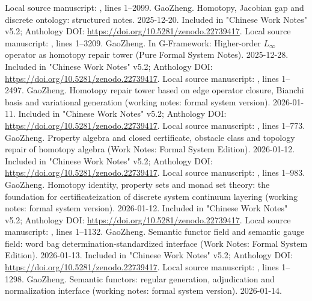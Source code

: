 \documentclass[11pt,a4paper]{article}
\theoremstyle{plain}
\theoremstyle{definition}
\theoremstyle{remark}
\begin{document}
\begin{CJK*}
\begin{thebibliography}
Local source manuscript: , lines 1--2099.  GaoZheng. Homotopy, Jacobian gap and discrete ontology: structured notes. 2025-12-20.\newblock
Included in "Chinese Work Notes" v5.2; Anthology DOI: \url{https://doi.org/10.5281/zenodo.22739417}.\newblock
Local source manuscript: , lines 1--3209.  GaoZheng. In G-Framework: Higher-order $L_\infty$ operator as homotopy repair tower (Pure Formal System Notes). 2025-12-28.\newblock
Included in "Chinese Work Notes" v5.2; Anthology DOI: \url{https://doi.org/10.5281/zenodo.22739417}.\newblock
Local source manuscript: , lines 1--2497.  GaoZheng. Homotopy repair tower based on edge operator closure, Bianchi basis and variational generation (working notes: formal system version). 2026-01-11.\newblock
Included in "Chinese Work Notes" v5.2; Anthology DOI: \url{https://doi.org/10.5281/zenodo.22739417}.\newblock
Local source manuscript: , lines 1--773.  GaoZheng. Property algebra and closed certificate, obstacle class and topology repair of homotopy algebra (Work Notes: Formal System Edition). 2026-01-12.\newblock
Included in "Chinese Work Notes" v5.2; Anthology DOI: \url{https://doi.org/10.5281/zenodo.22739417}.\newblock
Local source manuscript: , lines 1--983.  GaoZheng. Homotopy identity, property sets and monad set theory: the foundation for certificateization of discrete system continuum layering (working notes: formal system version). 2026-01-12.\newblock
Included in "Chinese Work Notes" v5.2; Anthology DOI: \url{https://doi.org/10.5281/zenodo.22739417}.\newblock
Local source manuscript: , lines 1--1132.  GaoZheng. Semantic functor field and semantic gauge field: word bag determination-standardized interface (Work Notes: Formal System Edition). 2026-01-13.
\newblock
Included in "Chinese Work Notes" v5.2; Anthology DOI: \url{https://doi.org/10.5281/zenodo.22739417}.\newblock
Local source manuscript: , lines 1--1298.  GaoZheng. Semantic functors: regular generation, adjudication and normalization interface (working notes: formal system version). 2026-01-14.\newblock

\end{thebibliography}
\end{CJK*}
\end{document}
